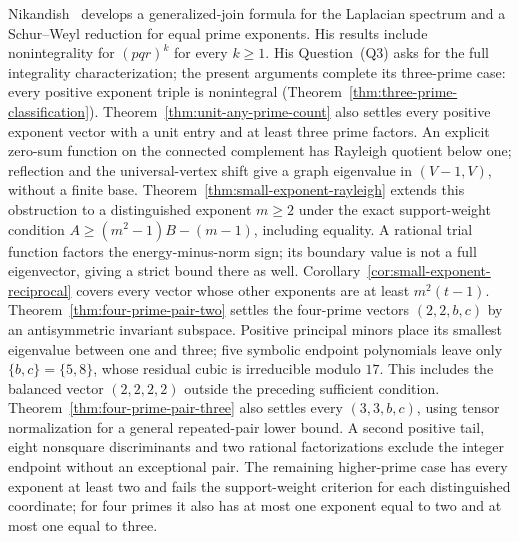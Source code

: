 Nikandish~\cite{nikandish} develops a generalized-join formula for the
Laplacian spectrum and a Schur--Weyl reduction for equal prime exponents.
His results include nonintegrality for $(pqr)^k$ for every $k\geq1$.
His Question~(Q3) asks for the full integrality characterization; the
present arguments complete its three-prime case: every positive exponent
triple is nonintegral (Theorem~\ref{thm:three-prime-classification}).
Theorem~\ref{thm:unit-any-prime-count} also settles every positive
exponent vector with a unit entry and at least three prime factors.
An explicit zero-sum function on the connected complement has Rayleigh
quotient below one; reflection and the universal-vertex shift give
a graph eigenvalue in $(V-1,V)$, without a finite base.
Theorem~\ref{thm:small-exponent-rayleigh} extends this obstruction
to a distinguished exponent $m\geq2$ under the exact support-weight
condition $A\geq(m^2-1)B-(m-1)$, including equality. A rational
trial function factors the energy-minus-norm sign; its boundary value
is not a full eigenvector, giving a strict bound there as well.
Corollary~\ref{cor:small-exponent-reciprocal} covers every vector whose
other exponents are at least $m^2(t-1)$.
Theorem~\ref{thm:four-prime-pair-two} settles the four-prime vectors
$(2,2,b,c)$ by an antisymmetric invariant subspace. Positive principal
minors place its smallest eigenvalue between one and three; five
symbolic endpoint polynomials leave only $\{b,c\}=\{5,8\}$, whose
residual cubic is irreducible modulo $17$. This includes the balanced
vector $(2,2,2,2)$ outside the preceding sufficient condition.
Theorem~\ref{thm:four-prime-pair-three} also settles every
$(3,3,b,c)$, using tensor normalization for a general repeated-pair
lower bound. A second positive tail, eight nonsquare discriminants
and two rational factorizations exclude the integer endpoint without
an exceptional pair.
The remaining higher-prime case has every exponent at least two and
fails the support-weight criterion for each distinguished coordinate;
for four primes it also has at most one exponent equal to two and
at most one equal to three.


